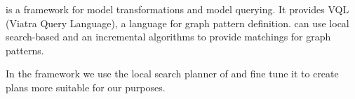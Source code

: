 \viatra{} \cite{viatra} is a framework for model transformations and model querying. 
It provides VQL (Viatra Query Language), a language for graph pattern definition.
\viatra{} can use local search-based and an incremental algorithms to provide matchings for graph patterns. 

In the framework we use the local search planner of \viatra{} and fine tune it to create plans more suitable for our purposes.







